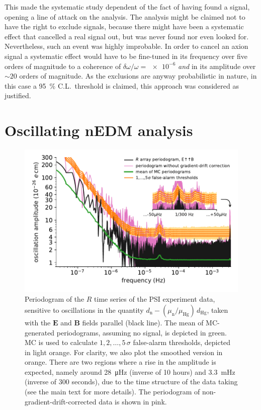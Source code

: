 This made the systematic study dependent of the fact of having found a signal, opening a line of attack on the analysis.
The analysis might be claimed not to have the right to exclude signals, because there might have been a systematic effect that cancelled a real signal out, but was never found nor even looked for.
Nevertheless, such an event was highly improbable.
In order to cancel an axion signal a systematic effect would have to be fine-tuned in its frequency over five orders of magnitude to a coherence of $\delta \omega / \omega = \num{e-6}$ \emph{and} in its amplitude over $\sim 20$ orders of magnitude.
As the exclusions are anyway probabilistic in nature, in this case a \SI{95}{\percent} C.L.\ threshold is claimed, this approach was considered as justified.




\section{Oscillating nEDM analysis}
\begin{figure}
  \centering
  \includegraphics[width=\linewidth]{gfx/axions/detection_psi_inset_gc.pdf}
  \caption{Periodogram of the $R$ time series of the PSI experiment data, sensitive to oscillations in the quantity $d_\mathrm{n} - \left( \mu_\mathrm{n} / \mu_\mathrm{Hg} \right) \, d_\mathrm{Hg}$, taken with the $\mathbf{E}$ and $\mathbf{B}$ fields parallel (black line).
  The mean of MC-generated periodograms, assuming no signal, is depicted in green. MC is used to calculate $1,2,…,5\,\sigma$ false-alarm thresholds, depicted in light orange.
  For clarity, we also plot the smoothed version in orange.
  There are two regions where a rise in the amplitude is expected, namely around \SI{28}{\micro\hertz} (inverse of 10 hours) and \SI{3.3}{\milli\hertz} (inverse of 300 seconds), due to the time structure of the data taking (see the main text for more details). The periodogram of non-gradient-drift-corrected data is shown in pink.}\label{fig:axions_PSI_detection}
\end{figure}

